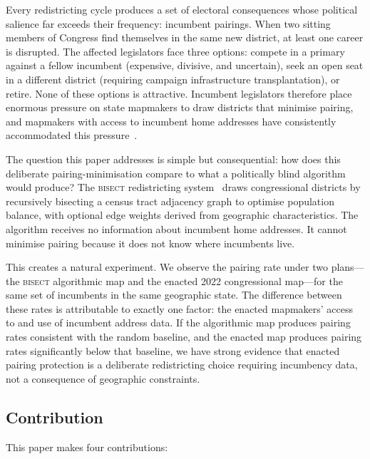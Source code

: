 \label{sec:introduction}

Every redistricting cycle produces a set of electoral consequences whose political
salience far exceeds their frequency: incumbent pairings. When two sitting members of
Congress find themselves in the same new district, at least one career is disrupted.
The affected legislators face three options: compete in a primary against a fellow
incumbent (expensive, divisive, and uncertain), seek an open seat in a different
district (requiring campaign infrastructure transplantation), or retire. None of these
options is attractive. Incumbent legislators therefore place enormous pressure on state
mapmakers to draw districts that minimise pairing, and mapmakers with access to incumbent
home addresses have consistently accommodated this pressure~\citep{altman2011public}.

The question this paper addresses is simple but consequential: how does this deliberate
pairing-minimisation compare to what a politically blind algorithm would produce?
The \textsc{bisect} redistricting system~\citep{bisect2024} draws congressional districts
by recursively bisecting a census tract adjacency graph to optimise population balance,
with optional edge weights derived from geographic characteristics. The algorithm receives
no information about incumbent home addresses. It cannot minimise pairing because it does
not know where incumbents live.

This creates a natural experiment. We observe the pairing rate under two plans---the
\textsc{bisect} algorithmic map and the enacted 2022 congressional map---for the same
set of incumbents in the same geographic state. The difference between these rates is
attributable to exactly one factor: the enacted mapmakers' access to and use of incumbent
address data. If the algorithmic map produces pairing rates consistent with the random
baseline, and the enacted map produces pairing rates significantly below that baseline,
we have strong evidence that enacted pairing protection is a deliberate redistricting
choice requiring incumbency data, not a consequence of geographic constraints.

\subsection{Contribution}

This paper makes four contributions:

